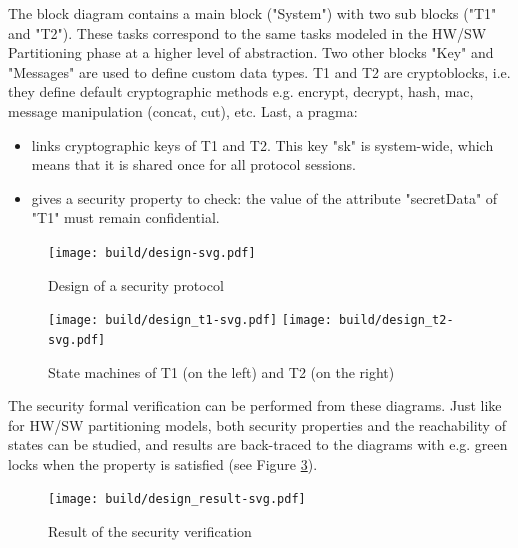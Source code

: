 \documentclass[12pt]{article}
\begin{document}
The block diagram contains a main block ("System") with two sub blocks ("T1" and "T2"). These tasks correspond to the same tasks modeled in the HW/SW Partitioning phase at a higher level of abstraction. Two other blocks "Key" and "Messages" are used to define custom data types. T1 and T2 are cryptoblocks, i.e. they define default cryptographic methods e.g. encrypt, decrypt, hash, mac, message manipulation (concat, cut), etc. Last, a pragma:
\begin{itemize}
\item links cryptographic keys of T1 and T2. This key "sk" is system-wide, which means that it is shared once for all protocol sessions.
\item gives a security property to check: the value of the attribute "secretData" of "T1" must remain confidential. 
\end{itemize}


\begin{figure}[htbp]
\centering
\texttt{[image: build/design-svg.pdf]}
\caption{Design of a security protocol} \label{fig:design}
\end{figure}

\begin{figure}[htbp]
\centering
\texttt{[image: build/design\_t1-svg.pdf]}\hspace{3cm}
\texttt{[image: build/design\_t2-svg.pdf]}
\caption{State machines of T1 (on the left) and T2 (on the right)} \label{fig:design_t}
\end{figure}

The security formal verification can be performed from these diagrams. Just like for HW/SW partitioning models, both security properties and the reachability of states can be studied, and results are back-traced to the diagrams with e.g. green locks when the property is satisfied (see Figure \ref{fig:design_result}).

\begin{figure}[htbp]
\centering
\texttt{[image: build/design\_result-svg.pdf]}
\caption{Result of the security verification} \label{fig:design_result}
\end{figure}
\end{document}
